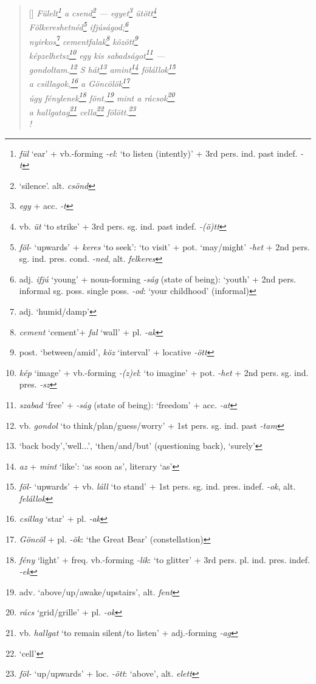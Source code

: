 \documentclass[a4paper,12pt,twoside,final]{book}
\begin{document}
\begin{verse}[\versewidth]
  \it
  Fülelt\footnote{\emph{fül} `ear' + vb.-forming \emph{-el}: `to
  listen (intently)' + 3rd pers. ind. past indef. \emph{-t}} a
  csend\footnote{`silence'. alt. \emph{csönd}}
  --- egyet\footnote{\emph{egy} + acc. \emph{-t}}
  ütött\footnote{vb. \emph{üt} `to strike' + 3rd
  pers. sg. ind. past indef. \emph{-(ö)tt}} \\
  Fölkereshetnéd\footnote{\emph{föl-}
  `upwards' + \emph{keres} `to seek': `to visit' +
  pot. `may/might' \emph{-het} + 2nd
  pers. sg. ind. pres. cond. \emph{-ned}, alt. \emph{felkeres}}
  ifjúságod;\footnote{adj. \emph{ifjú} `young' + noun-forming
  \emph{-ság} (state of being): `youth' + 2nd pers. informal sg.
  poss. single poss. \emph{-od}: `your childhood' (informal)} \\
  nyirkos\footnote{adj. `humid/damp'}
  cementfalak\footnote{\emph{cement} `cement'+ \emph{fal} `wall' +
  pl. \emph{-ak}} között\footnote{post. `between/amid', \emph{köz}
  `interval' + locative \emph{-ött}} \\
  képzelhetsz\footnote{\emph{kép} `image' + vb.-forming
  \emph{-(z)el}: `to imagine' + pot. \emph{-het} + 2nd
  pers. sg. ind. pres. \emph{-sz}} egy kis
  sabadságot\footnote{\emph{szabad} `free' + \emph{-ság} (state of
  being): `freedom' + acc. \emph{-at}} --- \\
  gondoltam.\footnote{vb. \emph{gondol} `to
  think/plan/guess/worry' + 1st pers. sg. ind. past
  \emph{-tam}} S hát\footnote{`back body','well...',
  `then/and/but' (questioning back), `surely'}
  amint\footnote{\emph{az} + \emph{mint} `like': `as soon as',
  literary `as'} fölállok\footnote{\emph{föl-}
  `upwards' +  vb. \emph{láll} `to stand' + 1st
  pers. sg. ind. pres. indef. \emph{-ok}, alt. \emph{felállok}} \\
  a csillagok,\footnote{\emph{csillag} `star' + pl. \emph{-ak}} a
  Göncölök\footnote{\emph{Göncöl} + pl. \emph{-ök}: `the Great Bear'
  (constellation)} \\
  úgy fénylenek\footnote{\emph{fény} `light' +
  freq. vb.-forming \emph{-lik}: `to glitter' + 3rd
  pers. pl. ind. pres. indef. \emph{-ek}}
  fönt,\footnote{adv. `above/up/awake/upstairs', alt. \emph{fent}}
  mint a rácsok\footnote{\emph{rács} `grid/grille' + pl. \emph{-ok}} \\
  a hallgatag\footnote{vb. \emph{hallgat} `to remain silent/to
  listen' + adj.-forming \emph{-ag}} cella\footnote{`cell'}
  fölött.\footnote{\emph{föl-} `up/upwards' +  loc. \emph{-ött}:
  `above', alt. \emph{elett}} \\!
\end{verse}
\end{document}
